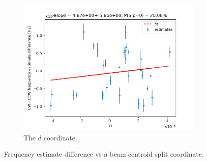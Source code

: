 \documentclass{article}
\begin{document}
\begin{figure}[!h]\ContinuedFloat
  \centering
  \begin{subfigure}[b]{\linewidth}
    \includegraphics[width=\linewidth]{img/spin_axis_motion/multiple/freq_estimates_vs_centroid_diff_D}
    \caption{The $d$ coordinate.}
  \end{subfigure}
  \caption{Frequency estimate difference vs a beam centroid split coordinate.\label{fig:BiasVsCentroid}}
\end{figure}
 


\end{document}
